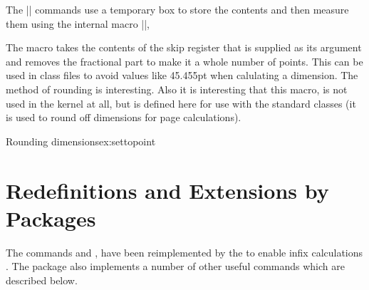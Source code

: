 The |\setto| commands use a temporary box \CMDI{\@tempboxa} to store the contents and then 
measure them using the internal macro |\@settodim|,

\medskip
{}
\begin{teX}
  \def\@settodim#1#2#3{\setbox\@tempboxa\hbox{{#3}}#2#1\@tempboxa
        \setbox\@tempboxa\box\voidb@x}
  \def\settoheight{\@settodim\ht}
  \def\settodepth {\@settodim\dp}
  \def\settowidth {\@settodim\wd}
\end{teX}
\medskip

\begin{macro}{\@settopoint}
The \CMDI{\@settopoint}
 macro takes the contents of the skip register that is supplied as its argument
and removes the fractional part to make it a whole number of points. This can be
used in class files to avoid values like 45.455pt when calulating a dimension. The method of
rounding is interesting. Also it is interesting that this macro, is not used in the kernel at all, but is defined
here for use with the standard classes (it is used to round off dimensions for page calculations).
\end{macro}

\begin{texexample}{Rounding dimensions}{ex:settopoint}
\bgroup 
  \makeatletter
  \def\@settopoint#1{\divide#1\p@\multiply#1\p@}
  \newlength\@test
  \setlength\@test{19.5pt}
  \@settopoint{\@test}
  \the\@test
  \makeatother
\egroup  
\end{texexample}

\section{Redefinitions and Extensions by Packages}

The commands \cmd{\settolength} and \cmd{\addtolength}, \cmd{\@settodim} have been reimplemented by the  to enable infix calculations \cite{calc}. The package also implements a number of other useful
commands which are described below. 

